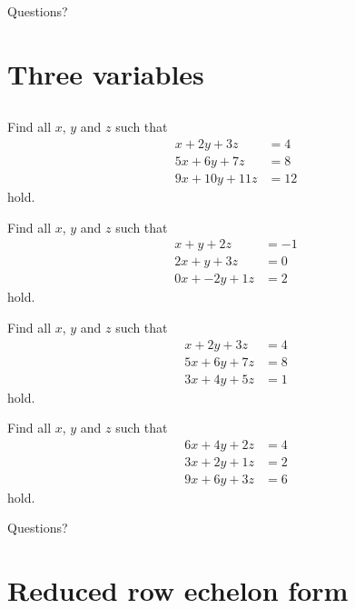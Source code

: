 \documentclass{beamer}
\begin{document}
\begin{frame}
Questions?
\end{frame}

\section{Three variables}
\subsection{}

\begin{frame}
  Find all $x$, $y$ and $z$ such that
  \begin{align*}
    x+2y+3z&=4\\
    5x+6y+7z&=8\\
    9x+10y+11z&=12
  \end{align*}
  hold.
\end{frame}

\begin{frame}
  Find all $x$, $y$ and $z$ such that
  \begin{align*}
    x+y+2z&=-1\\
    2x+y+3z&=0\\
    0x+-2y+1z&=2
  \end{align*}
  hold.
\end{frame}

\begin{frame}
  Find all $x$, $y$ and $z$ such that
  \begin{align*}
    x+2y+3z&=4\\
    5x+6y+7z&=8\\
    3x+4y+5z&=1
  \end{align*}
  hold.
\end{frame}

\begin{frame}
  Find all $x$, $y$ and $z$ such that
  \begin{align*}
    6x+4y+2z&=4\\
    3x+2y+1z&=2\\
    9x+6y+3z&=6
  \end{align*}
  hold.
\end{frame}

\begin{frame}
  Questions?
\end{frame}

\section{Reduced row echelon form}
\label{sec:Reduced-row-echelon-form}
\end{document}
